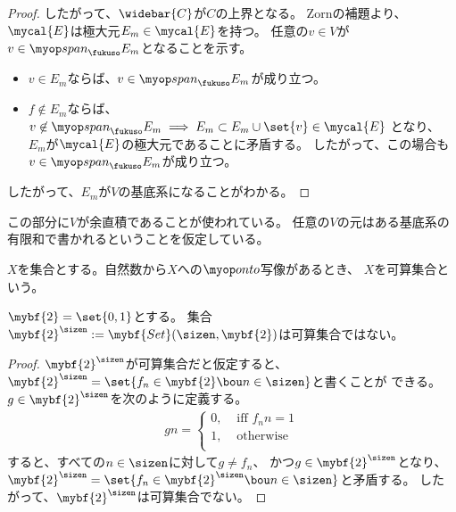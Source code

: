 \begin{proof}
	したがって、$\widebar{C}$が$C$の上界となる。
	Zornの補題より、$\mycal{E}$は極大元$E_m\in\mycal{E}$を持つ。
	任意の$v\in V$が$v\in \spanall_\fukuso E_m$となることを示す。
	\begin{itemize}\setlength{\itemsep}{-1mm} %
		\item $v\in E_m$ならば、$v\in\spanall_\fukuso E_m$が成り立つ。
		\item $f\not\in E_m$ならば、$v\not\in\spanall_\fukuso E_m
		\implies E_m\subset E_m\cup\set{v}\in\mycal{E}$
		となり、$E_m$が$\mycal{E}$の極大元であることに矛盾する。
		したがって、この場合も$v\in\spanall_\fukuso E_m$が成り立つ。
	\end{itemize} %
	したがって、$E_m$が$V$の基底系になることがわかる。
	\end{proof}
	\begin{note}[証明の注意]\label{note:証明の注意} %
		この部分に$V$が余直積であることが使われている。
		任意の$V$の元はある基底系の有限和で書かれるということを仮定している。
	\end{note} %

	\begin{definition}[可算集合]\label{def:可算集合} %
		$X$を集合とする。自然数から$X$への$\onto$写像があるとき、
		$X$を可算集合という。
	\end{definition} %

	\begin{proposition}[対角線論法]\label{prop:対角線論法} %
		$\mybf{2}=\set{0,1}$とする。
		集合$\mybf{2}^\sizen:=\mybf{Set}(\sizen,\mybf{2})$は可算集合ではない。
	\end{proposition} %
	\begin{proof} $\mybf{2}^\sizen$が可算集合だと仮定すると、
		$\mybf{2}^\sizen=\set{f_n\in\mybf{2}\bou n\in\sizen}$と書くことが
		できる。
		$g\in\mybf{2}^\sizen$を次のように定義する。
		\begin{equation*}\begin{split}
			gn = \begin{cases}
				0, &\text{ iff } f_nn=1 \\
				1, &\text{ otherwise } \\
			\end{cases}
		\end{split}\end{equation*}
		すると、すべての$n\in\sizen$に対して$g\neq f_n$、
		かつ$g\in\mybf{2}^\sizen$となり、
		$\mybf{2}^\sizen=\set{f_n\in\mybf{2}^\sizen\bou n\in\sizen}$と矛盾する。
		したがって、$\mybf{2}^\sizen$は可算集合でない。
	\end{proof}

